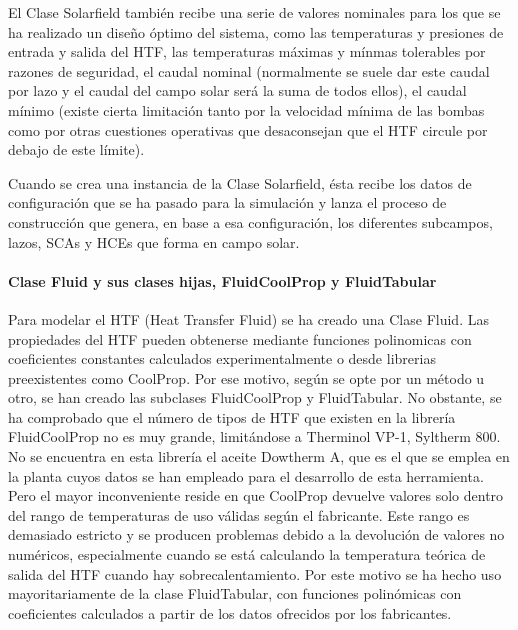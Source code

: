 El Clase Solarfield también recibe una serie de valores nominales para
los que se ha realizado un diseño óptimo del sistema, como las
temperaturas y presiones de entrada y salida del HTF, las temperaturas
máximas y mínmas tolerables por razones de seguridad, el caudal nominal
(normalmente se suele dar este caudal por lazo y el caudal del campo
solar será la suma de todos ellos), el caudal mínimo (existe cierta
limitación tanto por la velocidad mínima de las bombas como por otras
cuestiones operativas que desaconsejan que el HTF circule por debajo de
este límite).

Cuando se crea una instancia de la Clase Solarfield, ésta recibe los
datos de configuración que se ha pasado para la simulación y lanza el
proceso de construcción que genera, en base a esa configuración, los
diferentes subcampos, lazos, SCAs y HCEs que forma en campo solar.

\hypertarget{clase-fluid-y-sus-clases-hijas-fluidcoolprop-y-fluidtabular}{%
\paragraph{Clase Fluid y sus clases hijas, FluidCoolProp y
FluidTabular}\label{clase-fluid-y-sus-clases-hijas-fluidcoolprop-y-fluidtabular}}

Para modelar el HTF (Heat Transfer Fluid) se ha creado una Clase Fluid.
Las propiedades del HTF pueden obtenerse mediante funciones polinomicas
con coeficientes constantes calculados experimentalmente o desde
librerias preexistentes como CoolProp. Por ese motivo, según se opte por
un método u otro, se han creado las subclases FluidCoolProp y
FluidTabular. No obstante, se ha comprobado que el número de tipos de
HTF que existen en la librería FluidCoolProp no es muy grande,
limitándose a Therminol VP-1, Syltherm 800. No se encuentra en esta
librería el aceite Dowtherm A, que es el que se emplea en la planta
cuyos datos se han empleado para el desarrollo de esta herramienta. Pero
el mayor inconveniente reside en que CoolProp devuelve valores solo
dentro del rango de temperaturas de uso válidas según el fabricante.
Este rango es demasiado estricto y se producen problemas debido a la
devolución de valores no numéricos, especialmente cuando se está
calculando la temperatura teórica de salida del HTF cuando hay
sobrecalentamiento. Por este motivo se ha hecho uso mayoritariamente de
la clase FluidTabular, con funciones polinómicas con coeficientes
calculados a partir de los datos ofrecidos por los fabricantes.

